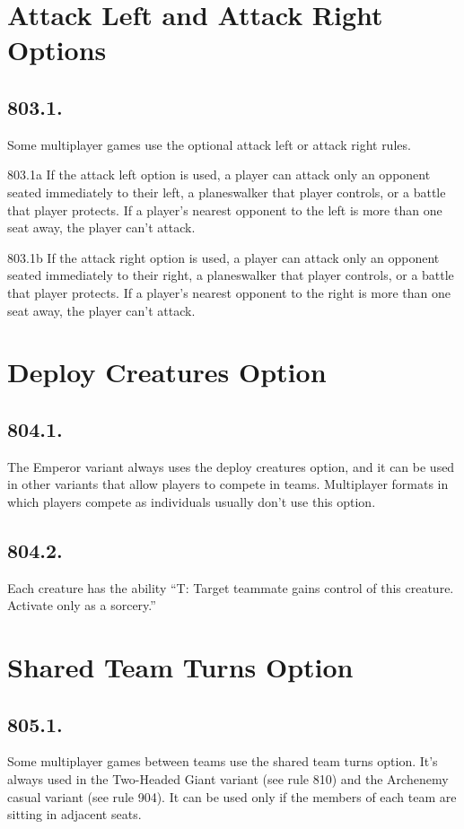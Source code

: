 \section{Attack Left and Attack Right Options}
\subsection*{803.1.}
Some multiplayer games use the optional attack left or attack right rules.

803.1a If the attack left option is used, a player can attack only an opponent seated immediately to their left, a planeswalker that player controls, or a battle that player protects. If a player’s nearest opponent to the left is more than one seat away, the player can’t attack.

803.1b If the attack right option is used, a player can attack only an opponent seated immediately to their right, a planeswalker that player controls, or a battle that player protects. If a player’s nearest opponent to the right is more than one seat away, the player can’t attack.

\section{Deploy Creatures Option}
\subsection*{804.1.}
The Emperor variant always uses the deploy creatures option, and it can be used in other variants that allow players to compete in teams. Multiplayer formats in which players compete as individuals usually don’t use this option.

\subsection*{804.2.}
Each creature has the ability “{T}: Target teammate gains control of this creature. Activate only as a sorcery.”

\section{Shared Team Turns Option}
\subsection*{805.1.}
Some multiplayer games between teams use the shared team turns option. It’s always used in the Two-Headed Giant variant (see rule 810) and the Archenemy casual variant (see rule 904). It can be used only if the members of each team are sitting in adjacent seats.

